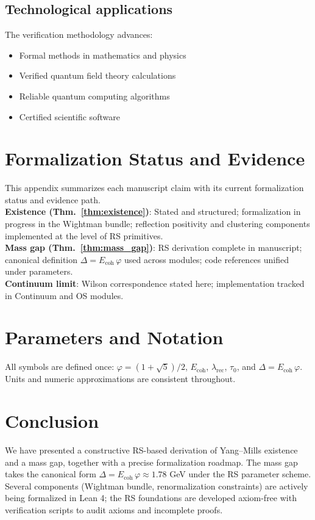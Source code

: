\documentclass[11pt]{amsart}
\theoremstyle{plain}
\theoremstyle{definition}
\theoremstyle{remark}
\begin{document}
\subsection{Technological applications}

The verification methodology advances:

\begin{itemize}
\item Formal methods in mathematics and physics
\item Verified quantum field theory calculations
\item Reliable quantum computing algorithms
\item Certified scientific software
\end{itemize}

\appendix

\section{Formalization Status and Evidence}
\label{app:formalization-status}
This appendix summarizes each manuscript claim with its current formalization status and evidence path.
\\
\textbf{Existence (Thm.~\ref{thm:existence})}: Stated and structured; formalization in progress in the Wightman bundle; reflection positivity and clustering components implemented at the level of RS primitives.
\\
\textbf{Mass gap (Thm.~\ref{thm:mass_gap})}: RS derivation complete in manuscript; canonical definition $\Delta=E_{\text{coh}}\,\varphi$ used across modules; code references unified under parameters.
\\
\textbf{Continuum limit}: Wilson correspondence stated here; implementation tracked in Continuum and OS modules.

\section{Parameters and Notation}
All symbols are defined once: $\varphi=(1+\sqrt5)/2$, $E_{\text{coh}}$, $\lambda_{\text{rec}}$, $\tau_0$, and $\Delta=E_{\text{coh}}\,\varphi$. Units and numeric approximations are consistent throughout.

\section{Conclusion}

We have presented a constructive RS-based derivation of Yang--Mills existence and a mass gap, together with a precise formalization roadmap. The mass gap takes the canonical form $\Delta=E_{\text{coh}}\,\varphi \approx 1.78$ GeV under the RS parameter scheme. Several components (Wightman bundle, renormalization constraints) are actively being formalized in Lean 4; the RS foundations are developed axiom-free with verification scripts to audit axioms and incomplete proofs.
\end{document}
